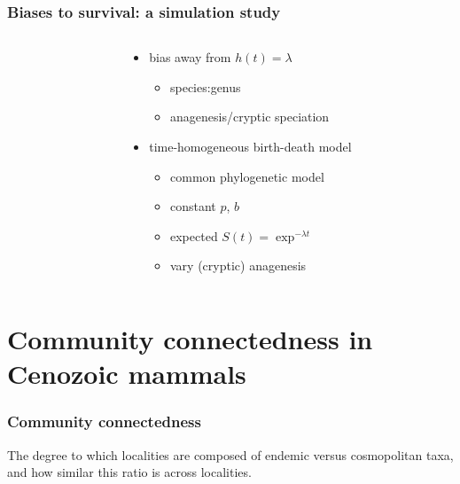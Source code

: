 \documentclass{beamer} \usepackage{amsmath,amsthm}
\begin{document}
\begin{frame} %
  \frametitle{Biases to survival: a simulation study}

  \begin{columns}
    \begin{column}{0.5\textwidth}
    \end{column}
    \begin{column}{0.5\textwidth}
      \begin{itemize}
        \item bias away from \(h(t) = \lambda\)
          \begin{itemize}
            \item species:genus
            \item anagenesis/cryptic speciation
          \end{itemize}
        \item time-homogeneous birth-death model
          \begin{itemize}
            \item common phylogenetic model
            \item constant \(p\), \(b\)
            \item expected \(S(t) = \exp^{-\lambda t}\)
            \item vary (cryptic) anagenesis
          \end{itemize}
      \end{itemize}
    \end{column}
  \end{columns}
\end{frame}


\section{Community connectedness in Cenozoic mammals}

\begin{frame}
  \frametitle{Community connectedness}
  \begin{definition}
    The degree to which localities are composed of endemic versus cosmopolitan taxa, and how similar this ratio is across localities.
  \end{definition}
\end{frame}
\end{document}
